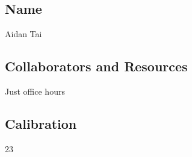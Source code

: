 \documentclass[submit]{harvardml}
\begin{document}
\newpage
\subsection*{Name}
Aidan Tai

\subsection*{Collaborators and Resources}
Just office hours

\subsection*{Calibration}
23
\end{document}
